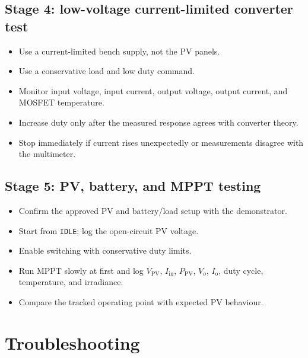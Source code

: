 \documentclass[11pt,a4paper]{article}
\newcommand{\code}[1]{\texttt{#1}}
\newcommand{\Vout}{V_{o}}
\newcommand{\Pin}{P_{\mathrm{PV}}}
\newcommand{\Iin}{I_{\mathrm{in}}}
\newcommand{\Iout}{I_{\mathrm{o}}}
\newcommand{\Vpv}{V_{\mathrm{PV}}}
\let\originalsection\section
\renewcommand{\section}{\clearpage\originalsection}
\begin{document}
\subsection{Stage 4: low-voltage current-limited converter test}

\begin{itemize}
  \item Use a current-limited bench supply, not the PV panels.
  \item Use a conservative load and low duty command.
  \item Monitor input voltage, input current, output voltage, output current, and MOSFET temperature.
  \item Increase duty only after the measured response agrees with converter theory.
  \item Stop immediately if current rises unexpectedly or measurements disagree with the multimeter.
\end{itemize}

\subsection{Stage 5: PV, battery, and MPPT testing}

\begin{itemize}
  \item Confirm the approved PV and battery/load setup with the demonstrator.
  \item Start from \code{IDLE}; log the open-circuit PV voltage.
  \item Enable switching with conservative duty limits.
  \item Run MPPT slowly at first and log $\Vpv$, $\Iin$, $\Pin$, $\Vout$, $\Iout$, duty cycle, temperature, and irradiance.
  \item Compare the tracked operating point with expected PV behaviour.
\end{itemize}

\section{Troubleshooting}
\end{document}
